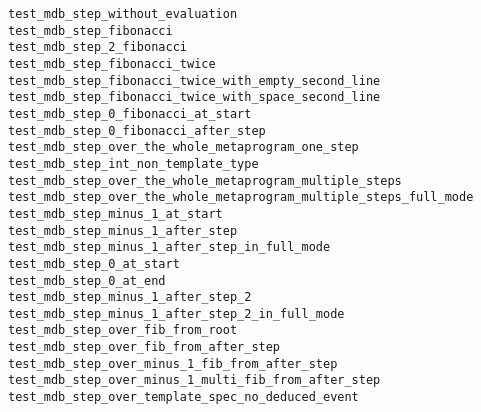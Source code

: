 \begin{description}
    \item[\texttt{test\_mdb\_step\_without\_evaluation}]
    \item[\texttt{test\_mdb\_step\_fibonacci}]
    \item[\texttt{test\_mdb\_step\_2\_fibonacci}]
    \item[\texttt{test\_mdb\_step\_fibonacci\_twice}]
    \item[\texttt{test\_mdb\_step\_fibonacci\_twice\_with\_empty\_second\_line}]
    \item[\texttt{test\_mdb\_step\_fibonacci\_twice\_with\_space\_second\_line}]
    \item[\texttt{test\_mdb\_step\_0\_fibonacci\_at\_start}]
    \item[\texttt{test\_mdb\_step\_0\_fibonacci\_after\_step}]
    \item[\texttt{test\_mdb\_step\_over\_the\_whole\_metaprogram\_one\_step}]
    \item[\texttt{test\_mdb\_step\_int\_non\_template\_type}]
    \item[\texttt{test\_mdb\_step\_over\_the\_whole\_metaprogram\_multiple\_steps}]
    \item[\texttt{test\_mdb\_step\_over\_the\_whole\_metaprogram\_multiple\_steps\_full\_mode}]
    \item[\texttt{test\_mdb\_step\_minus\_1\_at\_start}]
    \item[\texttt{test\_mdb\_step\_minus\_1\_after\_step}]
    \item[\texttt{test\_mdb\_step\_minus\_1\_after\_step\_in\_full\_mode}]
    \item[\texttt{test\_mdb\_step\_0\_at\_start}]
    \item[\texttt{test\_mdb\_step\_0\_at\_end}]
    \item[\texttt{test\_mdb\_step\_minus\_1\_after\_step\_2}]
    \item[\texttt{test\_mdb\_step\_minus\_1\_after\_step\_2\_in\_full\_mode}]
    \item[\texttt{test\_mdb\_step\_over\_fib\_from\_root}]
    \item[\texttt{test\_mdb\_step\_over\_fib\_from\_after\_step}]
    \item[\texttt{test\_mdb\_step\_over\_minus\_1\_fib\_from\_after\_step}]
    \item[\texttt{test\_mdb\_step\_over\_minus\_1\_multi\_fib\_from\_after\_step}]
    \item[\texttt{test\_mdb\_step\_over\_template\_spec\_no\_deduced\_event}]

\end{description}
